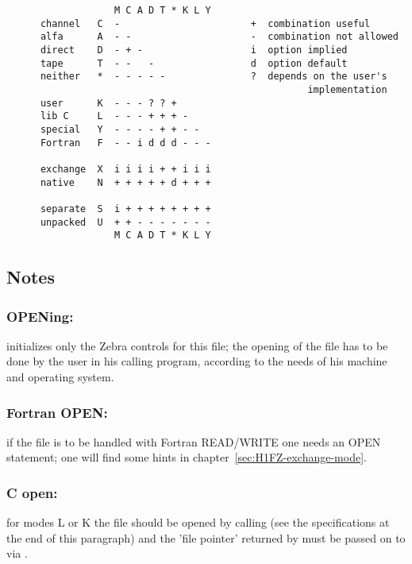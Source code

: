 \begin{verbatim}
                   M C A D T * K L Y
      channel   C  -                       +  combination useful
      alfa      A  - -                     -  combination not allowed
      direct    D  - + -                   i  option implied
      tape      T  - -   -                 d  option default
      neither   *  - - - - -               ?  depends on the user's
                                                     implementation
      user      K  - - - ? ? +
      lib C     L  - - - + + + -
      special   Y  - - - - + + - -
      Fortran   F  - - i d d d - - -

      exchange  X  i i i i + + i i i
      native    N  + + + + + d + + +

      separate  S  i + + + + + + + +
      unpacked  U  + + - - - - - - -
                   M C A D T * K L Y

\end{verbatim}

\subsection*{Notes}

\subsubsection*{OPENing:}

 initializes only the Zebra controls for this file;
the opening of the file has to be done by the user in his calling
program, according to the needs of his machine and operating system.

\subsubsection*{Fortran OPEN:}

if the file is to be handled with Fortran READ/WRITE one needs an
OPEN statement; one will find some hints in chapter~\ref{sec:H1FZ-exchange-mode}.

\subsubsection*{C open:}

for modes L or K the file should be opened by calling 
(see the specifications at the end of this paragraph)
and the 'file pointer' returned by  must be passed
on to  via .

